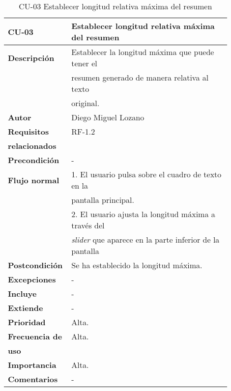 \begin{longtable}{>{\raggedright}b{0.2\linewidth}>{\raggedright\arraybackslash}b{0.7\linewidth}}
	\toprule
	\textbf{CU-03} & \textbf{Establecer longitud relativa máxima del resumen} \\
	\toprule
	\endhead
	
	\toprule
	\caption{CU-03 Establecer longitud relativa máxima del resumen}
	\endfoot
	
	\small{\textbf{Descripción}} & Establecer la longitud máxima que puede tener el \\
	& resumen generado de manera relativa al texto \\ & original. \\
	\small{\textbf{Autor}} & Diego Miguel Lozano \\
	\small{\textbf{Requisitos}} & RF-1.2  \\
	\small{\textbf{relacionados}} & \\
	\small{\textbf{Precondición}} & - \\
	\small{\textbf{Flujo normal}} & \quad \small{1. El usuario pulsa sobre el cuadro de texto en la} \\
	& \qquad \small{pantalla principal.} \\
	& \quad \small{2. El usuario ajusta la longitud máxima a través del} \\
	& \qquad \small{\emph{slider} que aparece en la parte inferior de la pantalla} \\
	\small{\textbf{Postcondición}} & Se ha establecido la longitud máxima. \\
	\small{\textbf{Excepciones}} & - \\
	\small{\textbf{Incluye}} & - \\
	\small{\textbf{Extiende}} & - \\
	\small{\textbf{Prioridad}} & Alta. \\
	\small{\textbf{Frecuencia de}} & Alta. \\
	\small{\textbf{uso}} & \\
	\small{\textbf{Importancia}} & Alta. \\
	\small{\textbf{Comentarios}} &  - \\
\end{longtable}



